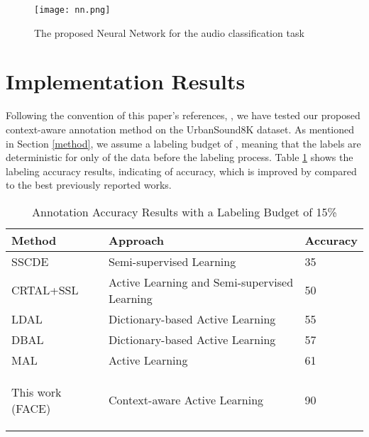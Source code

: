 \documentclass{article}
\begin{document}
\begin{figure}
	\centering	
	\texttt{[image: nn.png]}  		
	\caption{The proposed Neural Network for the audio classification task}
	\label{fig: nn}
\end{figure}

\section{Implementation Results}
\label{results}
Following the convention of this paper's references, \citep{Shuyang, Takagi, Dilek, Malte, Qin, Ji}, we have tested our proposed context-aware annotation method on the UrbanSound8K dataset. As mentioned in Section \ref{method}, we assume a labeling budget of , meaning that the labels are deterministic for only  of the data before the labeling process. Table \ref{tab: label} shows the labeling accuracy results, indicating  of accuracy, which is improved by  compared to the best previously reported works. 

\begin{table}
	\caption{Annotation Accuracy Results with a Labeling Budget of 15\%}
	\centering
	\begin{tabular}{lll}
		\toprule
		Method     & Approach     & Accuracy	\\
		\midrule
		SSCDE\citep{Takagi}	& Semi-supervised Learning	& 35	\\
		CRTAL+SSL\citep{Dilek, Malte}	& Active Learning and Semi-supervised Learning	& 50	\\	
		LDAL\citep{Qin}	& Dictionary-based Active Learning	& 55	\\
		DBAL\citep{Ji}	& Dictionary-based Active Learning	& 57	\\
		MAL\citep{Shuyang}	& Active Learning	& 61	\\
		\begin{bfseries}This work (FACE) \end{bfseries}	& \begin{bfseries}Context-aware Active Learning\end{bfseries}	& \begin{bfseries}90\end{bfseries}	\\
		\bottomrule
	\end{tabular}
	\label{tab: label}
\end{table}
\end{document}
